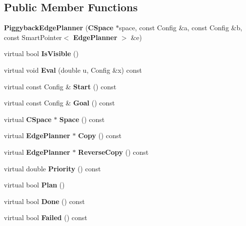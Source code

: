 \subsection*{Public Member Functions}
\begin{DoxyCompactItemize}
\item 
{\bfseries Piggyback\+Edge\+Planner} ({\bf C\+Space} $\ast$space, const Config \&a, const Config \&b, const Smart\+Pointer$<$ {\bf Edge\+Planner} $>$ \&e)\label{classPiggybackEdgePlanner_a8a7a0e442d566f471261f38f6c0b0ca7}

\item 
virtual bool {\bfseries Is\+Visible} ()\label{classPiggybackEdgePlanner_a29531b1409f23b9395f56ed7b3975deb}

\item 
virtual void {\bfseries Eval} (double u, Config \&x) const \label{classPiggybackEdgePlanner_a1b58547f0f4d4120f5a7b10ab65343c3}

\item 
virtual const Config \& {\bfseries Start} () const \label{classPiggybackEdgePlanner_a6f8e2b0637ee39fc46c25f2155628a21}

\item 
virtual const Config \& {\bfseries Goal} () const \label{classPiggybackEdgePlanner_abaf504e2b9aea8436edce876f169e358}

\item 
virtual {\bf C\+Space} $\ast$ {\bfseries Space} () const \label{classPiggybackEdgePlanner_a78922318d9668757c3fc31a75fe4793f}

\item 
virtual {\bf Edge\+Planner} $\ast$ {\bfseries Copy} () const \label{classPiggybackEdgePlanner_afa82124bc879db5bf5fb9313ce987b6c}

\item 
virtual {\bf Edge\+Planner} $\ast$ {\bfseries Reverse\+Copy} () const \label{classPiggybackEdgePlanner_a50453ad3d6b4ce6f2ac641f6ed5c20cd}

\item 
virtual double {\bfseries Priority} () const \label{classPiggybackEdgePlanner_a5b30aead46b654cd64080f288d96abc1}

\item 
virtual bool {\bfseries Plan} ()\label{classPiggybackEdgePlanner_a6b60eb41d119a0944401369be2c148f1}

\item 
virtual bool {\bfseries Done} () const \label{classPiggybackEdgePlanner_a550a9d05d08979531cbbc42cf43c6fd4}

\item 
virtual bool {\bfseries Failed} () const \label{classPiggybackEdgePlanner_ab16faca26566c9d4038cf586089ec6a7}

\end{DoxyCompactItemize}
